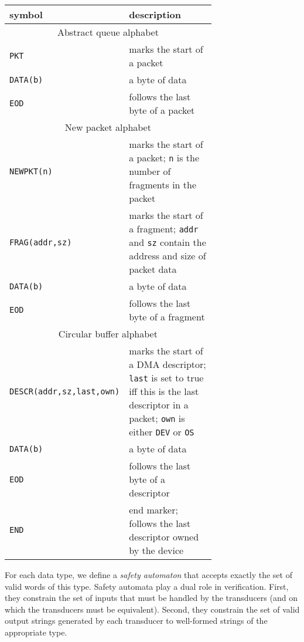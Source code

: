 \documentclass{article}
\begin{document}
\begin{table}
    \small
    \begin{tabular}{|l|p{0.7\linewidth}|}
        \hline
        symbol & description \\
        \hline\hline
        \multicolumn{2}{|c|}{Abstract queue alphabet}\\
        \hline
        \texttt{PKT}     & marks the start of a packet\\
        \texttt{DATA(b)} & a byte of data\\
        \texttt{EOD}     & follows the last byte of a packet\\
        \hline
        \multicolumn{2}{|c|}{New packet alphabet}\\
        \hline
        \texttt{NEWPKT(n)}     & marks the start of a packet; \texttt{n} is the number of fragments in the packet\\
        \texttt{FRAG(addr,sz)} & marks the start of a fragment; \texttt{addr} and \texttt{sz} contain the address and size of packet data\\
        \texttt{DATA(b)}       & a byte of data\\
        \texttt{EOD}           & follows the last byte of a fragment\\
        \hline
        \multicolumn{2}{|c|}{Circular buffer alphabet}\\
        \hline
        \texttt{DESCR(addr,sz,last,own)} & marks the start of a DMA descriptor; \texttt{last} is set to true iff this is the last descriptor in a packet; \texttt{own} is either \texttt{DEV} or \texttt{OS}\\
        \texttt{DATA(b)}       & a byte of data\\
        \texttt{EOD}           & follows the last byte of a descriptor \\
        \texttt{END}           & end marker; follows the last descriptor owned by the device \\
        \hline
    \end{tabular}
    \label{t:alphabet}
\end{table}

For each data type, we define a \emph{safety automaton} that 
accepts exactly the set of valid words of this type.  Safety 
automata play a dual role in verification.  First, they constrain 
the set of inputs that must be handled by the transducers (and on 
which the transducers must be equivalent).  Second, they constrain 
the set of valid output strings generated by each transducer to 
well-formed strings of the appropriate type.
\end{document}
